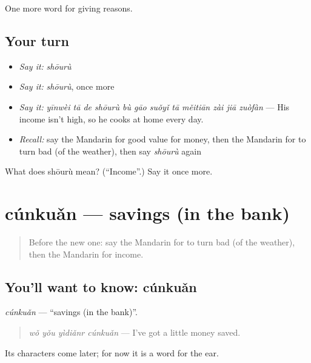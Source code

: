\begin{grammarlens}[title={What you've built}]
One more word for giving reasons.
\end{grammarlens}

\subsection*{Your turn}
\begin{itemize}
\raggedright
  \item \emph{Say it:} \emph{shōurù}
  \item \emph{Say it:} \emph{shōurù}, once more
  \item \emph{Say it:} \emph{yīnwèi tā de shōurù bù gāo suǒyǐ tā měitiān zài jiā zuòfàn} — His income isn't high, so he cooks at home every day.
  \item \emph{Recall:} say the Mandarin for good value for money, then the Mandarin for to turn bad (of the weather), then say \emph{shōurù} again
\end{itemize}

\begin{tcolorbox}[breakable,colback=teal!4,colframe=teal!35!black,title={Before you move on}]
What does shōurù mean? (\textquotedblleft{}Income\textquotedblright{}.) Say it once more.
\end{tcolorbox}
\section[cúnkuǎn]{cúnkuǎn — savings (in the bank)}

\label{lesson:ZH-C387-cunkuan}



\begin{quote}
Before the new one: say the Mandarin for to turn bad (of the weather), then the Mandarin for income.
\end{quote}

\subsection*{You'll want to know: cúnkuǎn}
\emph{cúnkuǎn} — \textquotedblleft{}savings (in the bank)\textquotedblright{}.

\begin{quote}
\emph{wǒ yǒu yìdiǎnr cúnkuǎn} — I've got a little money saved.
\end{quote}

Its characters come later; for now it is a word for the ear.

